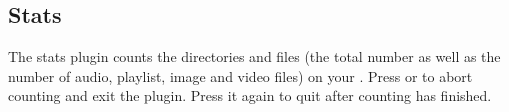 \subsection{Stats}

The stats plugin counts the directories and files
(the total number as well as the number
of audio, playlist, image and video files)
on your \dap{}.
Press \PluginCancel{} or \PluginExit{} to abort counting and
exit the plugin. Press it again to quit after counting has
finished.
